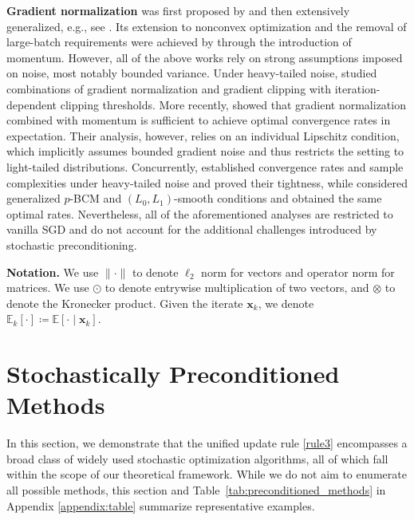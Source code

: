 \documentclass{article}
\newcommand{\bx}{\boldsymbol{x}}
\theoremstyle{plain}
\theoremstyle{definition}
\theoremstyle{remark}
\begin{document}
\noindent \textbf{Gradient normalization} was first proposed by \citep{nesterov1984minimization} and then extensively generalized, e.g., see \cite{levy2017online,hazan2015beyond,Yang2023Two,hubler2024parameter,levy2016power}. Its extension to nonconvex optimization and the removal of large-batch requirements were achieved by \cite{Cutkosky2020Momentum} through the introduction of momentum.
However, all of the above works rely on strong assumptions imposed on noise, most notably bounded variance. Under heavy-tailed noise, \citet{Cutkosky2021High} studied combinations of gradient normalization and gradient clipping with iteration-dependent clipping thresholds. More recently, \cite{Sun2025Revisiting} showed that gradient normalization combined with momentum is sufficient to achieve optimal convergence rates in expectation. Their analysis, however, relies on an individual Lipschitz condition, which implicitly assumes bounded gradient noise and thus restricts the setting to light-tailed distributions. Concurrently, \cite{Hubler2024Gradient} established convergence rates and sample complexities under heavy-tailed noise and proved their tightness, while \cite{Liu2025Nonconvex} considered generalized $p$-BCM and $(L_0,L_1)$-smooth conditions and obtained the same optimal rates. Nevertheless, all of the aforementioned analyses are restricted to vanilla SGD and do not account for the additional challenges introduced by stochastic preconditioning.






\textbf{Notation.}  We use $\|\cdot\|$ to denote $\ell_2$ norm for vectors and operator norm for matrices. We use $\odot$ to denote entrywise multiplication of two vectors, and $\otimes$ to denote the Kronecker product. Given the iterate $\bx_k$, we denote $\mathbb{E}_k[\cdot] \coloneqq\mathbb{E}[\cdot \mid \bx_{k}]$.

\section{Stochastically Preconditioned Methods}\label{sec2:preconditioned_methods}

In this section, we demonstrate that the unified update rule \eqref{rule3} encompasses a broad class of widely used stochastic optimization algorithms, all of which fall within the scope of our theoretical framework. While we do not aim to enumerate all possible methods, this section and Table~\ref{tab:preconditioned_methods} in Appendix \ref{appendix:table} summarize representative examples.
\end{document}
